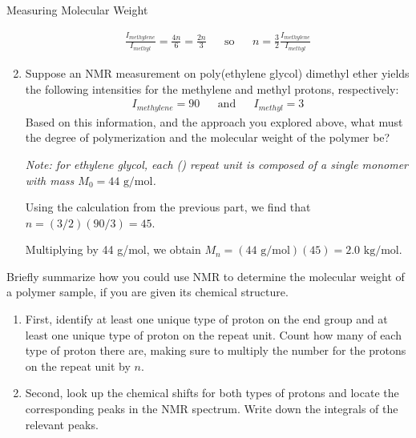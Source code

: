 \begin{activity}{Measuring Molecular Weight}
\begin{ctqs}
\begin{enumerate}
				\begin{solution}[1.25in]
					\begin{align*}
						\frac{I_{methylene}}{I_{methyl}} = \frac{4n}{6}=\frac{2n}{3} && \text{so} && n = \frac{3}{2}\frac{I_{methylene}}{I_{methyl}}
					\end{align*}
				\end{solution}
				
			\item Suppose an NMR measurement on poly(ethylene glycol) dimethyl ether yields the following intensities for the methylene and methyl protons, respectively:
				\begin{align*}
					I_{methylene}=90 && \text{and} &&
					I_{methyl}=3
				\end{align*}
				Based on this information, and the approach you explored above, what must the degree of polymerization and the molecular weight of the polymer be?
				
				\emph{Note: for ethylene glycol, each () repeat unit is composed of a single monomer with mass $M_0=44\text{ g/mol}$.}
				
				\begin{solution}[1.5in]
					Using the calculation from the previous part, we find that $n = (3/2)(90/3) = 45$.
					
					Multiplying by 44 g/mol, we obtain $M_n = (44\text{ g/mol})(45) = 2.0\text{ kg/mol}$.
				\end{solution}
				
		\end{enumerate}
		
		\question Briefly summarize how you could use NMR to determine the molecular weight of a polymer sample, if you are given its chemical structure.
		
			\begin{solution}[2in]
			
				\begin{enumerate}				
					\item First, identify at least one unique type of proton on the end group and at least one unique type of proton on the repeat unit.  Count how many of each type of proton there are, making sure to multiply the number for the protons on the repeat unit by $n$.
				
					\item Second, look up the chemical shifts for both types of protons and locate the corresponding peaks in the NMR spectrum.  Write down the integrals of the relevant peaks.
				

\end{enumerate}
\end{solution}
\end{ctqs}
\end{activity}
